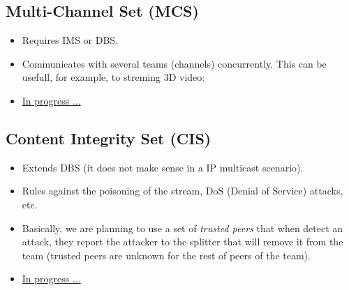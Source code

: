 \documentclass{article}
\begin{document}
\ifx \HCode\Undfef
\else
{}
\fi


\subsection{Multi-Channel Set (MCS)}

\begin{itemize}
\item Requires IMS or DBS.
\item Communicates with several teams (channels) concurrently. This
  can be usefull, for example, to streming 3D video:
\ifx \HCode\Undfef
\else
{}
\fi
\item
  \href{http://www.p2psp.org/en/p2psp-protocol?cap=indexsu14.xht#x23-190004.14}{In
    progress ...}
\end{itemize}


\subsection{Content Integrity Set (CIS)}

\begin{itemize}
\item Extends DBS (it does not make sense in a IP multicast
  scenario).
\item Rules against the poisoning of the stream, DoS (Denial of
  Service) attacks, etc.
\item Basically, we are planning to use a set of \emph{trusted peers}
  that when detect an attack, they report the attacker to the splitter
  that will remove it from the team (trusted peers are unknown for the
  rest of peers of the team).
\item
  \href{http://www.p2psp.org/en/p2psp-protocol?cap=indexsu15.xht#x24-200004.15}{In
    progress ...}
\end{itemize}
\end{document}
